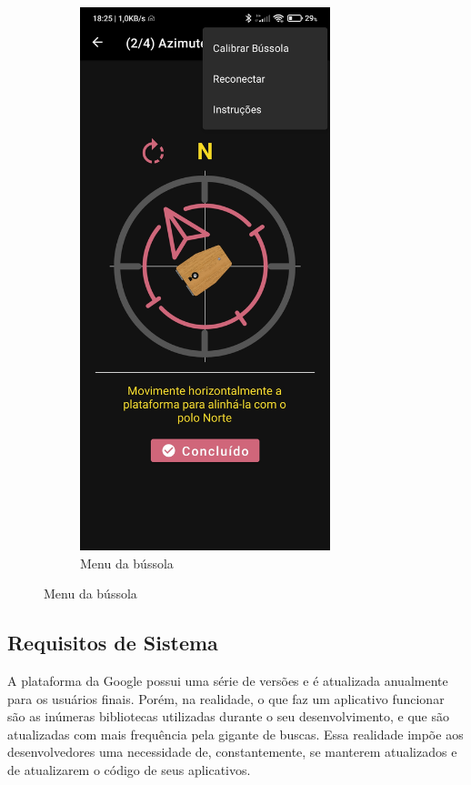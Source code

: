 \begin{figure}[!htb]
\begin{subfigure}[b]{0.3\textwidth}
		\includegraphics[width=0.8\textwidth]{figuras/desAplicativo/overbus}
		\caption{Menu da bússola}
		\label{menubus}
		
	\end{subfigure}
\end{figure}

\subsection{Requisitos de Sistema}

A plataforma da Google possui uma série de versões e é atualizada anualmente para os usuários finais. Porém, na realidade, o que faz um aplicativo funcionar são as inúmeras bibliotecas utilizadas durante o seu desenvolvimento, e que são atualizadas com mais frequência pela gigante de buscas. Essa realidade impõe aos desenvolvedores uma necessidade de, constantemente, se manterem atualizados e de atualizarem o código de seus aplicativos. 

